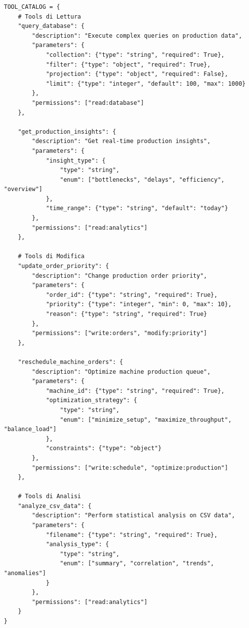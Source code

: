 \begin{listing}[H]
\begin{verbatim}
TOOL_CATALOG = {
    # Tools di Lettura
    "query_database": {
        "description": "Execute complex queries on production data",
        "parameters": {
            "collection": {"type": "string", "required": True},
            "filter": {"type": "object", "required": True},
            "projection": {"type": "object", "required": False},
            "limit": {"type": "integer", "default": 100, "max": 1000}
        },
        "permissions": ["read:database"]
    },
    
    "get_production_insights": {
        "description": "Get real-time production insights",
        "parameters": {
            "insight_type": {
                "type": "string", 
                "enum": ["bottlenecks", "delays", "efficiency", "overview"]
            },
            "time_range": {"type": "string", "default": "today"}
        },
        "permissions": ["read:analytics"]
    },
    
    # Tools di Modifica
    "update_order_priority": {
        "description": "Change production order priority",
        "parameters": {
            "order_id": {"type": "string", "required": True},
            "priority": {"type": "integer", "min": 0, "max": 10},
            "reason": {"type": "string", "required": True}
        },
        "permissions": ["write:orders", "modify:priority"]
    },
    
    "reschedule_machine_orders": {
        "description": "Optimize machine production queue",
        "parameters": {
            "machine_id": {"type": "string", "required": True},
            "optimization_strategy": {
                "type": "string",
                "enum": ["minimize_setup", "maximize_throughput", "balance_load"]
            },
            "constraints": {"type": "object"}
        },
        "permissions": ["write:schedule", "optimize:production"]
    },
    
    # Tools di Analisi
    "analyze_csv_data": {
        "description": "Perform statistical analysis on CSV data",
        "parameters": {
            "filename": {"type": "string", "required": True},
            "analysis_type": {
                "type": "string",
                "enum": ["summary", "correlation", "trends", "anomalies"]
            }
        },
        "permissions": ["read:analytics"]
    }
}
\end{verbatim}
\caption{Definizione del catalogo tools MCP}
\label{listing:mcp-tool-catalog}
\end{listing}

